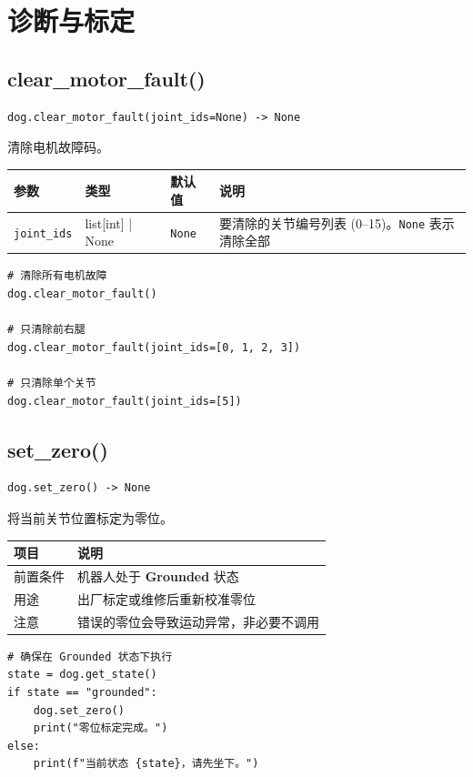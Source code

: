 \documentclass[a4paper,11pt,openany]{book}
\begin{document}
\section{诊断与标定}

\subsection{clear\_motor\_fault()}

\begin{lstlisting}[style=python,numbers=none]
dog.clear_motor_fault(joint_ids=None) -> None
\end{lstlisting}

清除电机故障码。

\begin{longtable}{llll}
\toprule
参数 & 类型 & 默认值 & 说明 \\
\midrule
\endhead
\texttt{joint\_ids} & list[int] | None & \texttt{None} & 要清除的关节编号列表 (0--15)。\texttt{None} 表示清除全部 \\
\bottomrule
\end{longtable}

\begin{lstlisting}[style=python]
# 清除所有电机故障
dog.clear_motor_fault()

# 只清除前右腿
dog.clear_motor_fault(joint_ids=[0, 1, 2, 3])

# 只清除单个关节
dog.clear_motor_fault(joint_ids=[5])
\end{lstlisting}

\subsection{set\_zero()}

\begin{lstlisting}[style=python,numbers=none]
dog.set_zero() -> None
\end{lstlisting}

将当前关节位置标定为零位。

\begin{longtable}{ll}
\toprule
项目 & 说明 \\
\midrule
\endhead
前置条件 & 机器人处于 \textbf{Grounded} 状态 \\
用途 & 出厂标定或维修后重新校准零位 \\
注意 & 错误的零位会导致运动异常，非必要不调用 \\
\bottomrule
\end{longtable}

\begin{lstlisting}[style=python]
# 确保在 Grounded 状态下执行
state = dog.get_state()
if state == "grounded":
    dog.set_zero()
    print("零位标定完成。")
else:
    print(f"当前状态 {state}，请先坐下。")
\end{lstlisting}
\end{document}
